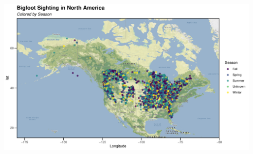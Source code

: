 \documentclass[
]{article}
\begin{document}
\begin{center}\includegraphics[width=1\linewidth]{week7HW_files/figure-latex/unnamed-chunk-4-1} \end{center}
\end{document}
